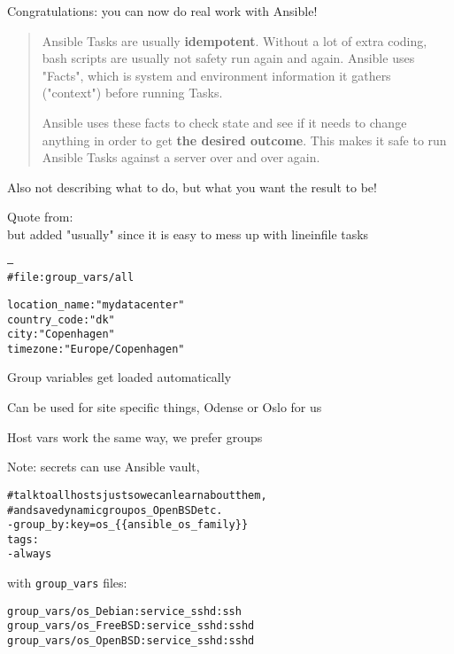 \documentclass[18pt,landscape,a4paper,footrule]{foils}
\begin{document}
\vskip 5mm
\centerline{Congratulations: you can now do real work with Ansible!}



\begin{quote}
Ansible Tasks are usually {\bf idempotent}. Without a lot of extra coding, bash scripts are usually not safety run again and again. Ansible uses "Facts", which is system and environment information it gathers ("context") before running Tasks.

Ansible uses these facts to check state and see if it needs to change anything in order to get {\bf the desired outcome}. This makes it safe to run Ansible Tasks against a server over and over again.
\end{quote}

Also not describing what to do, but what you want the result to be!

Quote from:\\
 but added "usually" since it is easy to mess up with lineinfile tasks


\begin{alltt}
---
# file: group_vars/all

location_name : "mydatacenter"
country_code : "dk"
city : "Copenhagen"
timezone : "Europe/Copenhagen"
\end{alltt}

\begin{list2}
\item Group variables get loaded automatically
\item Can be used for site specific things, Odense or Oslo for us
\item Host vars work the same way, we prefer groups
\item Note: secrets can use Ansible vault,\\ 
\end{list2}



\begin{alltt}
  # talk to all hosts just so we can learn about them,
  # and save dynamic group os_OpenBSD etc.
  - group_by: key=os_\{\{ ansible_os_family \}\}
    tags:
        - always
\end{alltt}

with \verb+group_vars+ files:
\begin{alltt}
group_vars/os_Debian:service_sshd: ssh
group_vars/os_FreeBSD:service_sshd: sshd
group_vars/os_OpenBSD:service_sshd: sshd
\end{alltt}
\end{document}
